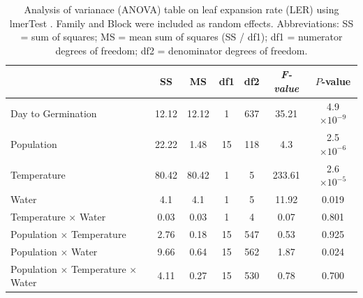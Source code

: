 \documentclass[11pt, oneside]{article}
\newcommand{\pkg}[1]{{\fontseries{b}\selectfont #1}}
\begin{document}





\begin{table}[htbp]
	\fontsize{10}{12}
	\selectfont
	\caption[ANOVA table, leaf expansion rate]{Analysis of varianace (ANOVA) table on leaf expansion rate (LER) using \pkg{lmerTest} \citep{Kuznetsova_etal_2016}. Family and Block were included as random effects. Abbreviations: SS = sum of squares; MS = mean sum of squares (SS / df1); df1 = numerator degrees of freedom; df2 = denominator degrees of freedom.}
	\begin{center}
	\begin{tabular}{lcccccc}
	\toprule

  & SS & MS & df1 & df2 & \em{F}-value & $P$-value \\ \midrule
  Day to Germination & 12.12 & 
    12.12 & 1 & 
    637 & 35.21 &
    4.9 $\times10^{-9}$ \\
  Population & 22.22 & 1.48 & 
    15 & 118 & 
    4.3 & 2.5 $\times10^{-6}$ \\
  Temperature & 80.42 & 
    80.42 & 1 &
    5 & 233.61 &
    2.6 $\times10^{-5}$ \\
  Water & 4.1 & 4.1 & 
    1 & 5 & 
    11.92 & 0.019 \\
  Temperature $\times$ Water & 0.03 & 
    0.03 & 
    1 & 
    4 & 
    0.07 &
    0.801 \\
  Population $\times$ Temperature & 2.76 & 
    0.18 & 
    15 & 
    547 & 
    0.53 &
    0.925 \\
  Population $\times$ Water & 9.66 & 
    0.64 & 
    15 &
    562 &
    1.87 & 
    0.024 \\
  Population $\times$ Temperature $\times$ Water & 
    4.11 & 
    0.27 & 
    15 & 
    530 & 
    0.78 & 
    0.700 \\
	\bottomrule
	\end{tabular}
	\label{table:TableS_fitLER}
	\end{center}
\end{table}

\end{document}
